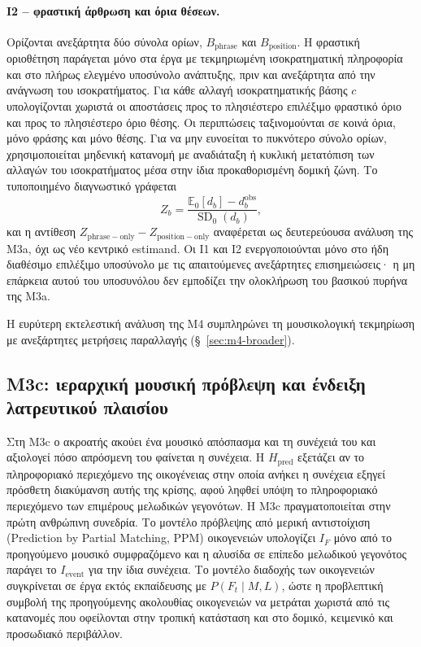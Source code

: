 \documentclass[11pt,a4paper]{article}
\begin{document}
\paragraph{I2 -- φραστική άρθρωση και όρια θέσεων.} Ορίζονται ανεξάρτητα δύο σύνολα ορίων, $B_{\mathrm{phrase}}$ και $B_{\mathrm{position}}$. Η φραστική οριοθέτηση παράγεται μόνο στα έργα με τεκμηριωμένη ισοκρατηματική πληροφορία και στο πλήρως ελεγμένο υποσύνολο ανάπτυξης, πριν και ανεξάρτητα από την ανάγνωση του ισοκρατήματος. Για κάθε αλλαγή ισοκρατηματικής βάσης $c$ υπολογίζονται χωριστά οι αποστάσεις προς το πλησιέστερο επιλέξιμο φραστικό όριο και προς το πλησιέστερο όριο θέσης. Οι περιπτώσεις ταξινομούνται σε κοινά όρια, μόνο φράσης και μόνο θέσης. Για να μην ευνοείται το πυκνότερο σύνολο ορίων, χρησιμοποιείται μηδενική κατανομή με αναδιάταξη ή κυκλική μετατόπιση των αλλαγών του ισοκρατήματος μέσα στην ίδια προκαθορισμένη δομική ζώνη. Το τυποποιημένο διαγνωστικό γράφεται
\[
Z_b=\frac{\mathbb E_0[d_b]-d_b^{\mathrm{obs}}}{\operatorname{SD}_0(d_b)},
\]
και η αντίθεση $Z_{\mathrm{phrase-only}}-Z_{\mathrm{position-only}}$ αναφέρεται ως δευτερεύουσα ανάλυση της M3a, όχι ως νέο κεντρικό estimand. Οι I1 και I2 ενεργοποιούνται μόνο στο ήδη διαθέσιμο επιλέξιμο υποσύνολο με τις απαιτούμενες ανεξάρτητες επισημειώσεις· η μη επάρκεια αυτού του υποσυνόλου δεν εμποδίζει την ολοκλήρωση του βασικού πυρήνα της M3a.

Η ευρύτερη εκτελεστική ανάλυση της M4 συμπληρώνει τη μουσικολογική τεκμηρίωση με ανεξάρτητες μετρήσεις παραλλαγής (§~\ref{sec:m4-broader}).

\subsection{M3c: ιεραρχική μουσική πρόβλεψη και ένδειξη λατρευτικού πλαισίου}\label{sec:m3c}

Στη M3c ο ακροατής ακούει ένα μουσικό απόσπασμα και τη συνέχειά του και αξιολογεί πόσο απρόσμενη του φαίνεται η συνέχεια. Η $H_{\mathrm{pred}}$ εξετάζει αν το πληροφοριακό περιεχόμενο της οικογένειας στην οποία ανήκει η συνέχεια εξηγεί πρόσθετη διακύμανση αυτής της κρίσης, αφού ληφθεί υπόψη το πληροφοριακό περιεχόμενο των επιμέρους μελωδικών γεγονότων. Η M3c πραγματοποιείται στην πρώτη ανθρώπινη συνεδρία. Το μοντέλο πρόβλεψης από μερική αντιστοίχιση (Prediction by Partial Matching, PPM) οικογενειών υπολογίζει $I_F$ μόνο από το προηγούμενο μουσικό συμφραζόμενο και η αλυσίδα σε επίπεδο μελωδικού γεγονότος παράγει το $I_{\mathrm{event}}$ για την ίδια συνέχεια. Το μοντέλο διαδοχής των οικογενειών συγκρίνεται σε έργα εκτός εκπαίδευσης με $P(F_t\mid M,L)$, ώστε η προβλεπτική συμβολή της προηγούμενης ακολουθίας οικογενειών να μετράται χωριστά από τις κατανομές που οφείλονται στην τροπική κατάσταση και στο δομικό, κειμενικό και προσωδιακό περιβάλλον.
\end{document}
